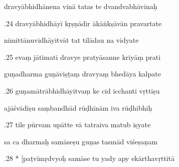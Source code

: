 \documentclass[article,12pt,a4paper]{memoir}%
\newcounter{parCount}
\begin{document}
	  
	  \pstart \leavevmode%
	dravyābhidhānena vinā tatas te dvandvabhāvinaḥ 
	{}
	\pend%
      

	  
	  \pstart {}.24 dravyābhidhāyī kṛṣṇādir ākāṅkṣāvān pravartate 
	{}
	\pend%
      

	  
	  \pstart \leavevmode%
	nimittānuvidhāyitvāt tat tilādau na vidyate 
	{}
	\pend%
      

	  
	  \pstart {}.25 evaṃ jātimati dravye pratyāsanne kriyāṃ prati 
	{}
	\pend%
      

	  
	  \pstart \leavevmode%
	guṇadharma guṇāviṣṭaṃ dravyaṃ bhedāya kalpate 
	{}
	\pend%
      

	  
	  \pstart {}.26 guṇamātrābhidhāyitvaṃ ke cid icchanti vṛttiṣu 
	{}
	\pend%
      

	  
	  \pstart \leavevmode%
	ajāśvādiṣu saṃbandhād rūḍhīnām iva rūḍhibhiḥ 
	{}
	\pend%
      

	  
	  \pstart {}.27 tile pūrvam upātte vā tatraiva matub iṣyate 
	{}
	\pend%
      

	  
	  \pstart \leavevmode%
	sa ca dharmaḥ samāseṣu guṇas tasmād viśeṣaṇam 
	{}
	\pend%
      

	  
	  \pstart {}.28 * [paṭvīmṛdvyoḥ samāse tu yady apy ekārthavṛttitā 
	{}
	\pend%
      
\end{document}
